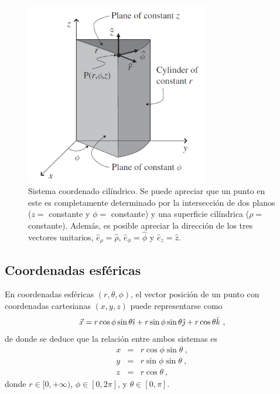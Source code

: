 \begin{figure}[htbp]
    \centering
    \includegraphics[width=8cm]{Figuras/Lineas-coordenadas-cilindricas.png}
    \caption{Sistema coordenado cilíndrico. Se puede apreciar que un punto en este es completamente determinado por la intersección de dos planos ($z =$ constante y $\phi = $ constante) y una superficie cilíndrica ($\rho = $ constante). Además, es posible apreciar la dirección de los tres vectores unitarios, $\hat{e}_\rho = \hat{\rho}$, $\hat{e}_\phi = \hat{\phi}$ y $\hat{e}_z = \hat{z}$.}
\end{figure}


\subsection{Coordenadas esféricas}

En coordenadas esféricas $(r, \theta, \phi)$, el vector posición de un punto con coordenadas cartesianas $(x,y,z)$ puede representarse como 
\begin{equation}
    \vec{x} = r \cos \phi \sin \theta \hat{\imath} + r \sin \phi \sin \theta \hat{\jmath} + r \cos \theta \hat{k} \ ,
\end{equation}
de donde se deduce que la relación entre ambos sistemas es 
\begin{equation}
    \begin{array}{rcl}
        x & = & r \cos \phi \sin \theta \ , \\
        y & = & r \sin \phi \sin \theta \ , \\
        z & = & r \cos \theta \ ,
    \end{array}
\end{equation} 
donde $r \in [0, +\infty)$, $\phi \in [0, 2\pi]$, y $\theta \in [0, \pi]$.

